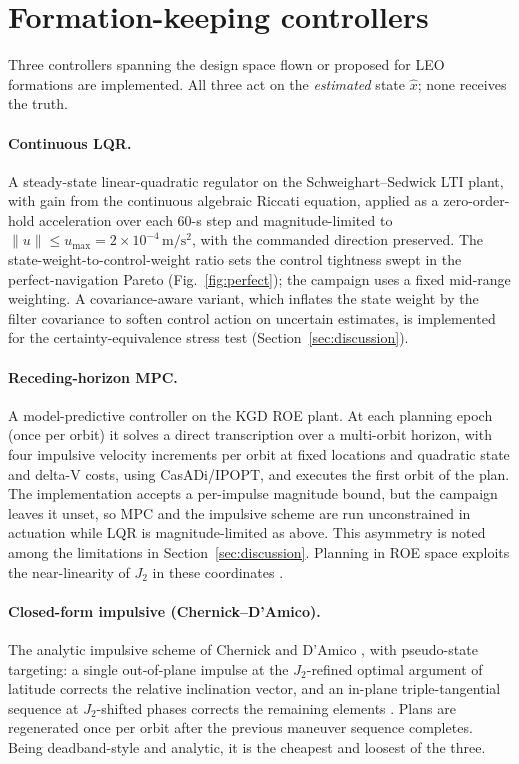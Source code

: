 \section{Formation-keeping controllers}\label{sec:controllers}

Three controllers spanning the design space flown or proposed for LEO
formations are implemented. All three act on the \emph{estimated} state
$\hat{x}$; none receives the truth.

\paragraph{Continuous LQR.}
A steady-state linear-quadratic regulator on the Schweighart--Sedwick LTI
plant, with gain from the continuous algebraic Riccati equation, applied as
a zero-order-hold acceleration over each 60-s step and magnitude-limited to
$\lVert u \rVert \le u_{\max} = 2\times10^{-4}\,\mathrm{m/s^2}$, with the
commanded direction preserved. The state-weight-to-control-weight ratio sets
the control tightness swept in the perfect-navigation Pareto
(Fig.~\ref{fig:perfect}); the campaign uses a fixed mid-range weighting. A
covariance-aware variant, which inflates the state weight by the filter
covariance to soften control action on uncertain estimates, is implemented
for the certainty-equivalence stress test (Section~\ref{sec:discussion}).

\paragraph{Receding-horizon MPC.}
A model-predictive controller on the KGD ROE plant. At each planning epoch
(once per orbit) it solves a direct transcription over a multi-orbit
horizon, with four impulsive velocity increments per orbit at fixed
locations and quadratic state and delta-V costs, using CasADi/IPOPT, and
executes the first orbit of the plan. The implementation accepts a
per-impulse magnitude bound, but the campaign leaves it unset, so MPC and
the impulsive scheme are run unconstrained in actuation while LQR is
magnitude-limited as above. This asymmetry is noted among the limitations in
Section~\ref{sec:discussion}. Planning in ROE space exploits the
near-linearity of $J_2$ in these coordinates \cite{koenig2017stm}.

\paragraph{Closed-form impulsive (Chernick--D'Amico).}
The analytic impulsive scheme of Chernick and D'Amico
\cite{chernick2018closedform,chernick2021reachable}, with pseudo-state
targeting: a single out-of-plane impulse at the $J_2$-refined optimal
argument of latitude corrects the relative inclination vector, and an
in-plane triple-tangential sequence at $J_2$-shifted phases corrects the
remaining elements \cite{gaias2015impulsive,vaddi2005formation}. Plans are
regenerated once per orbit after the previous maneuver sequence completes.
Being deadband-style and analytic, it is the cheapest and loosest of the
three.

